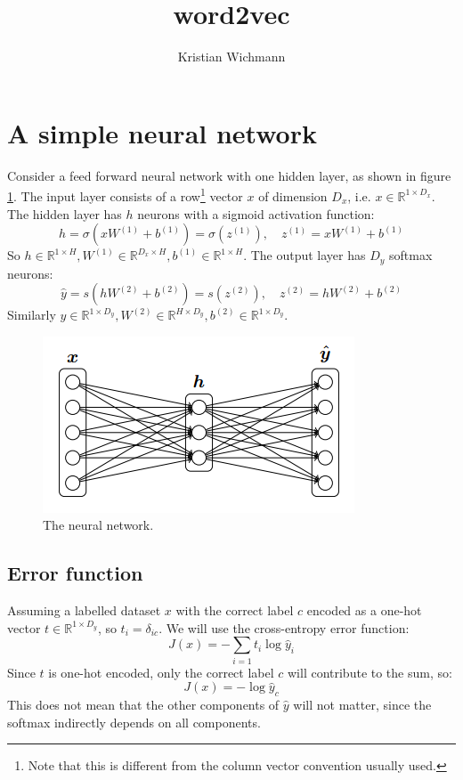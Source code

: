 \documentclass[12pt, a4paper]{article}
\title{word2vec}
\author{Kristian Wichmann}
\numberwithin{equation}{section}
\begin{document}
\maketitle

\section{A simple neural network}
Consider a feed forward neural network with one hidden layer, as shown in figure \ref{fig:nn}. The input layer consists of a row\footnote{Note that this is different from the column vector convention usually used.} vector $x$ of dimension $D_x$, i.e. $x\in\mathbb{R}^{1\times D_x}$. The hidden layer has $h$ neurons with a sigmoid activation function:
\begin{equation}
h=\sigma(xW^{(1)}+b^{(1)})=\sigma(z^{(1)}),\quad z^{(1)}=xW^{(1)}+b^{(1)}
\end{equation}
So $h\in\mathbb{R}^{1\times H}, W^{(1)}\in\mathbb{R}^{D_x\times H}, b^{(1)}\in\mathbb{R}^{1\times H}$. The output layer has $D_y$ softmax neurons:
\begin{equation}
\hat{y}=s(hW^{(2)}+b^{(2)})=s(z^{(2)}),\quad z^{(2)}=hW^{(2)}+b^{(2)}
\end{equation}
Similarly $\hat{y}\in\mathbb{R}^{1\times D_y}, W^{(2)}\in\mathbb{R}^{H\times D_y}, b^{(2)}\in\mathbb{R}^{1\times D_y}$.

\begin{figure}
\centering
\includegraphics{w2v_nn}
\caption{The neural network.}
\label{fig:nn}
\end{figure}

\subsection{Error function}
Assuming a labelled dataset $x$ with the correct label $c$ encoded as a one-hot vector $t\in\mathbb{R}^{1\times D_y}$, so $t_i=\delta_{ic}$. We will use the cross-entropy error function:
\begin{equation}
J(x)=-\sum_{i=1}t_i\log\hat{y}_i
\end{equation}
Since $t$ is one-hot encoded, only the correct label $c$ will contribute to the sum, so:
\begin{equation}
J(x)=-\log\hat{y}_c
\end{equation}
This does not mean that the other components of $\hat{y}$ will not matter, since the softmax indirectly depends on all components.
\end{document}
